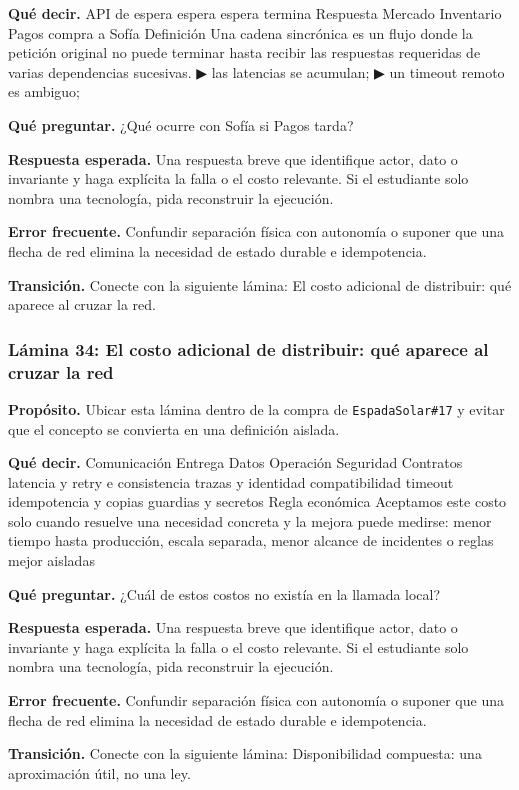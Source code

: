 \documentclass[variant=docente,cover=institutional,mode=screen]{ua-engineering-v6-article}
\begin{document}
\textbf{Qué decir.} API de espera espera espera termina Respuesta Mercado Inventario Pagos compra a Sofía Definición Una cadena sincrónica es un flujo donde la petición original no puede terminar hasta recibir las respuestas requeridas de varias dependencias sucesivas. ▶ las latencias se acumulan; ▶ un timeout remoto es ambiguo;

\textbf{Qué preguntar.} ¿Qué ocurre con Sofía si Pagos tarda?

\textbf{Respuesta esperada.} Una respuesta breve que identifique actor, dato o invariante y haga explícita la falla o el costo relevante. Si el estudiante solo nombra una tecnología, pida reconstruir la ejecución.

\textbf{Error frecuente.} Confundir separación física con autonomía o suponer que una flecha de red elimina la necesidad de estado durable e idempotencia.

\textbf{Transición.} Conecte con la siguiente lámina: El costo adicional de distribuir: qué aparece al cruzar la red.

\subsubsection*{Lámina 34: El costo adicional de distribuir: qué aparece al cruzar la red}
\textbf{Propósito.} Ubicar esta lámina dentro de la compra de \texttt{EspadaSolar\#17} y evitar que el concepto se convierta en una definición aislada.

\textbf{Qué decir.} Comunicación Entrega Datos Operación Seguridad Contratos latencia y retry e consistencia trazas y identidad compatibilidad timeout idempotencia y copias guardias y secretos Regla económica Aceptamos este costo solo cuando resuelve una necesidad concreta y la mejora puede medirse: menor tiempo hasta producción, escala separada, menor alcance de incidentes o reglas mejor aisladas

\textbf{Qué preguntar.} ¿Cuál de estos costos no existía en la llamada local?

\textbf{Respuesta esperada.} Una respuesta breve que identifique actor, dato o invariante y haga explícita la falla o el costo relevante. Si el estudiante solo nombra una tecnología, pida reconstruir la ejecución.

\textbf{Error frecuente.} Confundir separación física con autonomía o suponer que una flecha de red elimina la necesidad de estado durable e idempotencia.

\textbf{Transición.} Conecte con la siguiente lámina: Disponibilidad compuesta: una aproximación útil, no una ley.
\end{document}
